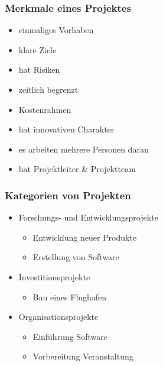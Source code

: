 \begin{multicols}{2}
	\subsubsection{Merkmale eines Projektes}
	\begin{itemize}
		\item einmaliges Vorhaben
		\item klare Ziele
		\item hat Risiken
		\item zeitlich begrenzt
		\item Kostenrahmen
		\item hat innovativen Charakter
		\item es arbeiten mehrere Personen daran
		\item hat Projektleiter \& Projektteam 
	\end{itemize} 
	
	\subsubsection{Kategorien von Projekten}
	\begin{itemize}
		\item Forschungs- und Entwicklungsprojekte
		\begin{itemize}
			\item  Entwicklung neuer Produkte
			\item  Erstellung von Software
		\end{itemize}			 
		\item Investitionsprojekte
		\begin{itemize}
			\item Bau eines Flughafen			
		\end{itemize}
		\item Organisationsprojekte
		\begin{itemize}
			\item Einführung Software
			\item Vorbereitung Veranstaltung
		\end{itemize}
	\end{itemize}
\end{multicols}

